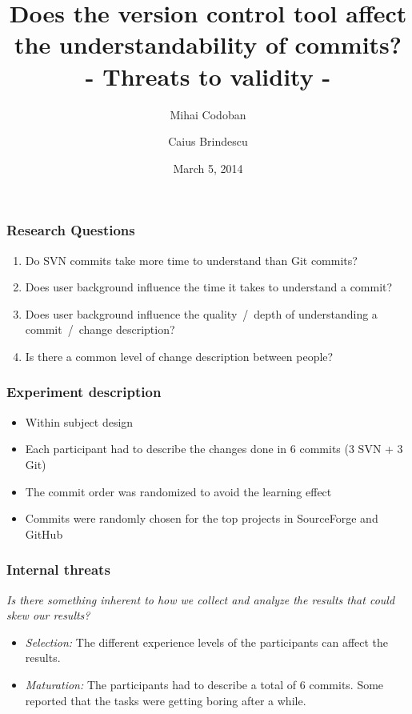 \documentclass{beamer}
\title{Does the version control tool affect the understandability of commits? \\ - Threats to validity - }
\author{Mihai Codoban \and Caius Brindescu}
\date{March 5, 2014}
\begin{document}
\begin{frame}
\titlepage
\end{frame}

\begin{frame}
\frametitle{Research Questions}
\begin{enumerate}
	\item Do SVN commits take more time to understand than Git commits?
	\item Does user background influence the time it takes to understand a commit?
	\item Does user background influence the quality~/~depth of understanding a commit~/~change description?
	\item Is there a common level of change description between people?
\end{enumerate}
\end{frame}

\begin{frame}
\frametitle{Experiment description}
\begin{itemize}
	\item Within subject design
	\item Each participant had to describe the changes done in 6 commits (3 SVN + 3 Git)
	\item The commit order was randomized to avoid the learning effect
	\item Commits were randomly chosen for the top projects in SourceForge and GitHub
\end{itemize}
\end{frame}

\begin{frame}
\frametitle{Internal threats}
\emph{Is there something inherent to how we collect and analyze the results that could skew our results?}

\begin{itemize}
	\item{\emph{Selection:}} The different experience levels of the participants can affect the results.
	\item{\emph{Maturation:}} The participants had to describe a total of 6 commits.
	Some reported that the tasks were getting boring after a while.
\end{itemize}
\end{frame}
\end{document}
